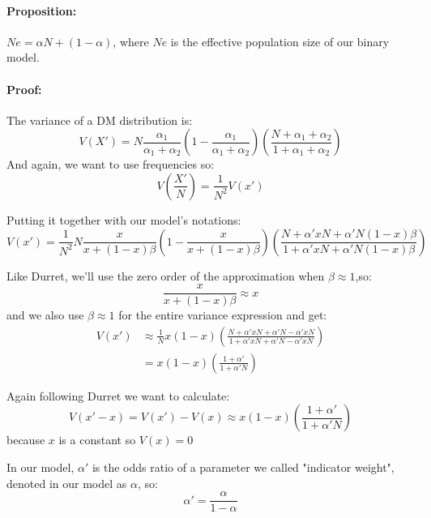 \documentclass[11pt]{article}
\begin{document}
\paragraph{Proposition:} $Ne=\alpha N + (1-\alpha)$, where $Ne$ is the effective population size of our binary model.

\paragraph{Proof:} The variance of a DM distribution is:
\begin{equation}
V(X') = N\frac{\alpha_1}{\alpha_1+\alpha_2}(1-\frac{\alpha_1}{\alpha_1+\alpha_2})
(\frac{N + \alpha_1+\alpha_2}{1+\alpha_1+\alpha_2})
\end{equation}
And again, we want to use frequencies so:
\begin{equation}
V(\frac{X'}{N}) = \frac{1}{N^2}V(x')
\end{equation}

Putting it together with our model's notations:
\begin{equation}
V(x') = \frac{1}{N^2}N\frac{x}{x+(1-x)\beta}(1-\frac{x}{x+(1-x)\beta})
(\frac{N + \alpha' xN + \alpha' N(1-x)\beta}{1 + \alpha' xN + \alpha' N(1-x)\beta}) 
\end{equation}

Like Durret, we'll use the zero order of the approximation when $\beta\approx1$,so:
\begin{equation}
\frac{x}{x + (1-x)\beta} \approx x
\end{equation}
and we also use $\beta\approx1$ for the entire variance expression and get:
\begin{equation}
\begin{split}
V(x') & \approx  \frac{1}{N} x(1-x)
(\frac{N + \alpha' xN + \alpha' N - \alpha' xN}{1 + \alpha' xN + \alpha' N - \alpha' xN})\\
&=  x(1-x)(\frac{1 + \alpha'}{1 + \alpha' N}) 
\end{split}
\end{equation}

Again following Durret we want to calculate:
\begin{equation}\label{eq:var_diff_durret}
V(x'-x) = V(x') - V(x) \approx  x(1-x)(\frac{1 + \alpha'}{1 + \alpha' N})
\end{equation}
because $x$ is a constant so $V(x) = 0$

In our model, $\alpha'$ is the odds ratio of a parameter we called "indicator weight", denoted in our model as $\alpha$, so:
\begin{equation}\label{eq:success_ratio}
\alpha' = \frac{\alpha}{1-\alpha}
\end{equation}
\end{document}
